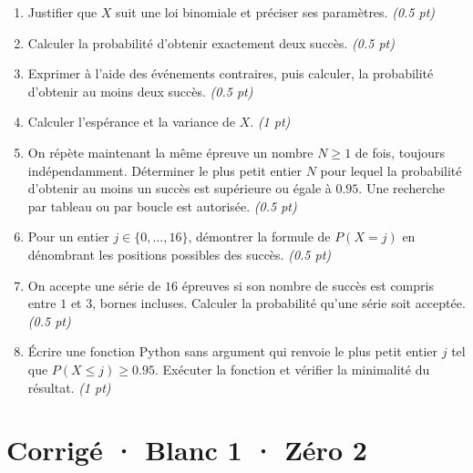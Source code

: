\begin{enumerate}

\item Justifier que $X$ suit une loi binomiale et préciser ses paramètres. \hfill\textit{(\num{0,5} pt)}

\item Calculer la probabilité d'obtenir exactement deux succès. \hfill\textit{(\num{0,5} pt)}

\item Exprimer à l'aide des événements contraires, puis calculer, la probabilité d'obtenir au moins deux succès. \hfill\textit{(\num{0,5} pt)}

\item Calculer l'espérance et la variance de $X$. \hfill\textit{(1 pt)}

\item On répète maintenant la même épreuve un nombre $N\ge1$ de fois, toujours indépendamment. Déterminer le plus petit entier $N$ pour lequel la probabilité d'obtenir au moins un succès est supérieure ou égale à $\num{0,95}$. Une recherche par tableau ou par boucle est autorisée. \hfill\textit{(\num{0,5} pt)}

\item Pour un entier $j\in\{0,\ldots,16\}$, démontrer la formule de $P(X=j)$ en dénombrant les positions possibles des succès. \hfill\textit{(\num{0,5} pt)}

\item On accepte une série de $16$ épreuves si son nombre de succès est compris entre $1$ et $3$, bornes incluses. Calculer la probabilité qu'une série soit acceptée. \hfill\textit{(\num{0,5} pt)}

\item Écrire une fonction Python sans argument qui renvoie le plus petit entier $j$ tel que $P(X\le j)\ge\num{0,95}$. Exécuter la fonction et vérifier la minimalité du résultat. \hfill\textit{(1 pt)}

\end{enumerate}

\ifmxteacher\mxnewpage

\section*{Corrigé · Blanc 1 · Zéro 2}\label{cor:5-2}


